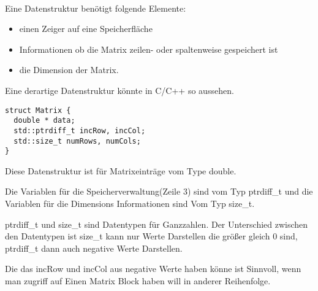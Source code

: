 \\


Eine Datenstruktur benötigt folgende Elemente:
\begin{itemize}
	\item einen Zeiger auf eine Speicherfläche
	\item Informationen ob die Matrix zeilen- oder spaltenweise gespeichert ist 
	\item die Dimension der Matrix.
\end{itemize}


Eine derartige Datenstruktur könnte in C/C++ so aussehen.
\begin{lstlisting}
struct Matrix {
  double * data;
  std::ptrdiff_t incRow, incCol;
  std::size_t numRows, numCols;
}
\end{lstlisting}

Diese Datenstruktur ist für Matrixeinträge vom Type double.

Die Variablen für die Speicherverwaltung(Zeile 3) sind vom Typ ptrdiff\_t und die Variablen für die Dimensions Informationen sind Vom Typ size\_t.

ptrdiff\_t und size\_t sind Datentypen für Ganzzahlen. Der Unterschied zwischen den Datentypen ist size\_t kann nur Werte Darstellen die größer gleich 0 sind, ptrdiff\_t dann auch negative Werte Darstellen.

Die das incRow und incCol aus negative Werte haben könne ist Sinnvoll, wenn man zugriff auf Einen Matrix Block haben will in anderer Reihenfolge.

